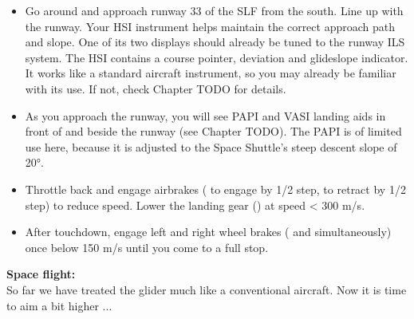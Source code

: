 \documentclass[Orbiter User Manual.tex]{subfiles}
\begin{document}
\begin{itemize}
\item Go around and approach runway 33 of the SLF from the south. Line up with the runway. Your HSI instrument helps maintain the correct approach path and slope. One of its two displays should already be tuned to the runway ILS system. The HSI contains a course pointer, deviation and glideslope indicator. It works like a standard aircraft instrument, so you may already be familiar with its use. If not, check Chapter TODO for details.
\item As you approach the runway, you will see PAPI and VASI landing aids in front of and beside the runway (see Chapter TODO). The PAPI is of limited use here, because it is adjusted to the Space Shuttle's steep descent slope of 20°.
\item Throttle back and engage airbrakes ( to engage by 1/2 step, \Alt{} to retract by 1/2 step) to reduce speed. Lower the landing gear () at speed < 300 m/s.
\item After touchdown, engage left and right wheel brakes (\keystroke{,} and  simultaneously) once below 150 m/s until you come to a full stop.
\end{itemize}

\noindent
\textbf{Space flight:}\\
So far we have treated the glider much like a conventional aircraft. Now it is time to aim a bit higher ...
\end{document}
